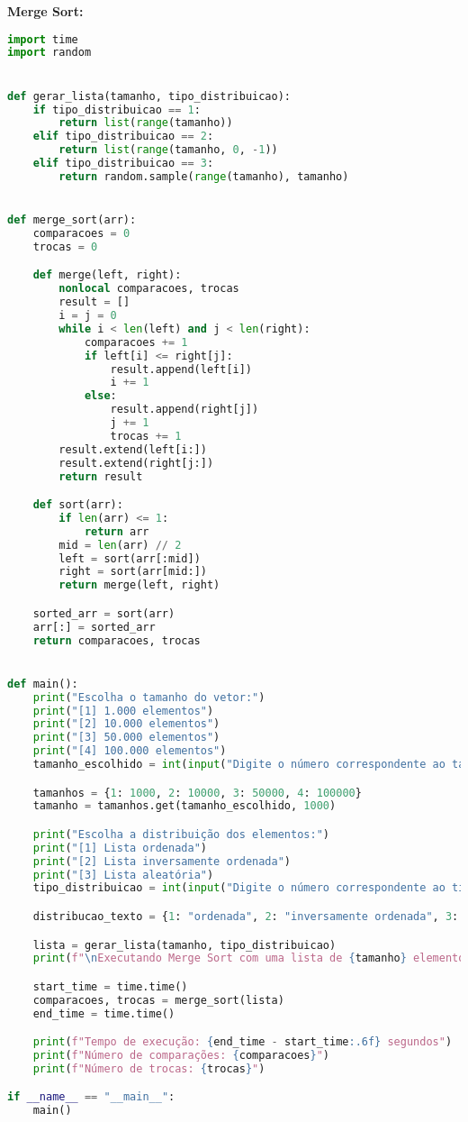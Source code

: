 \documentclass[a4paper,12pt]{article}
\begin{document}
 \textbf{Merge Sort: } \\
\begin{lstlisting}[language=Python]
import time
import random


def gerar_lista(tamanho, tipo_distribuicao):
    if tipo_distribuicao == 1:
        return list(range(tamanho))
    elif tipo_distribuicao == 2:
        return list(range(tamanho, 0, -1))
    elif tipo_distribuicao == 3:
        return random.sample(range(tamanho), tamanho)


def merge_sort(arr):
    comparacoes = 0
    trocas = 0

    def merge(left, right):
        nonlocal comparacoes, trocas
        result = []
        i = j = 0
        while i < len(left) and j < len(right):
            comparacoes += 1
            if left[i] <= right[j]:
                result.append(left[i])
                i += 1
            else:
                result.append(right[j])
                j += 1
                trocas += 1
        result.extend(left[i:])
        result.extend(right[j:])
        return result

    def sort(arr):
        if len(arr) <= 1:
            return arr
        mid = len(arr) // 2
        left = sort(arr[:mid])
        right = sort(arr[mid:])
        return merge(left, right)

    sorted_arr = sort(arr)
    arr[:] = sorted_arr
    return comparacoes, trocas


def main():
    print("Escolha o tamanho do vetor:")
    print("[1] 1.000 elementos")
    print("[2] 10.000 elementos")
    print("[3] 50.000 elementos")
    print("[4] 100.000 elementos")
    tamanho_escolhido = int(input("Digite o número correspondente ao tamanho do vetor: "))

    tamanhos = {1: 1000, 2: 10000, 3: 50000, 4: 100000}
    tamanho = tamanhos.get(tamanho_escolhido, 1000)

    print("Escolha a distribuição dos elementos:")
    print("[1] Lista ordenada")
    print("[2] Lista inversamente ordenada")
    print("[3] Lista aleatória")
    tipo_distribuicao = int(input("Digite o número correspondente ao tipo de distribuição: "))

    distribucao_texto = {1: "ordenada", 2: "inversamente ordenada", 3: "aleatória"}

    lista = gerar_lista(tamanho, tipo_distribuicao)
    print(f"\nExecutando Merge Sort com uma lista de {tamanho} elementos ({distribucao_texto[tipo_distribuicao]}).\n")

    start_time = time.time()
    comparacoes, trocas = merge_sort(lista)
    end_time = time.time()

    print(f"Tempo de execução: {end_time - start_time:.6f} segundos")
    print(f"Número de comparações: {comparacoes}")
    print(f"Número de trocas: {trocas}")

if __name__ == "__main__":
    main()

\end{lstlisting}
\end{document}

